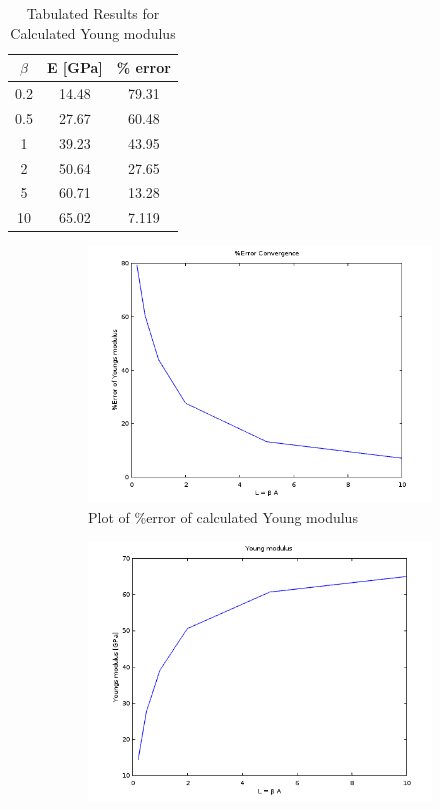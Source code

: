 \documentclass[paper=letter, fontsize=11pt]{scrartcl} %
\numberwithin{equation}{section} %
\numberwithin{figure}{section} %
\numberwithin{table}{section} %
\begin{document}
\begin{table}[!ht]
\centering
	\begin{tabular}{c c c}
		 $\beta$ & E [GPa] & \% error \\
		 \hline
		 0.2 & 14.48 & 79.31 \\
		 0.5 & 27.67 & 60.48\\
		 1 & 39.23 & 43.95\\
		 2 & 50.64 & 27.65\\
		 5 & 60.71 & 13.28\\
		 10 & 65.02 & 7.119\\
		\hline
	\end{tabular}
\caption{Tabulated Results for Calculated Young modulus}
\label{tab:q2table1}
\end{table}

\begin{figure}[h]
\centering
	\begin{subfigure}[b]{0.45\textwidth}
		\includegraphics[width=\textwidth]{q2_error.png}
		\caption{Plot of \%error of calculated Young modulus}
		\label{fig:q2fig1}
	\end{subfigure}
	\hfill
	\begin{subfigure}[b]{0.45\textwidth}
		\includegraphics[width=\textwidth]{q2_youngmod.png}

\end{subfigure}
\end{figure}
\end{document}
